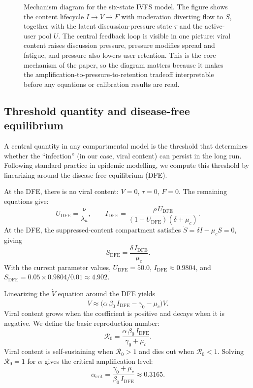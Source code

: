 \documentclass[11pt]{article}
\begin{document}
\begin{figure}[htbp]
\begin{tikzpicture}
\end{tikzpicture}
\caption{Mechanism diagram for the six-state IVFS model. The figure shows the content lifecycle $I \to V \to F$ with moderation diverting flow to $S$, together with the latent discussion-pressure state $\tau$ and the active-user pool $U$. The central feedback loop is visible in one picture: viral content raises discussion pressure, pressure modifies spread and fatigue, and pressure also lowers user retention. This is the core mechanism of the paper, so the diagram matters because it makes the amplification-to-pressure-to-retention tradeoff interpretable before any equations or calibration results are read.}
\label{fig:structure}
\end{figure}

\subsection{Threshold quantity and disease-free equilibrium}
\label{sec:threshold}

A central quantity in any compartmental model is the threshold that determines whether the ``infection'' (in our case, viral content) can persist in the long run. Following standard practice in epidemic modelling, we compute this threshold by linearizing around the disease-free equilibrium (DFE).

At the DFE, there is no viral content: $V = 0$, $\tau = 0$, $F = 0$. The remaining equations give:
\begin{equation}
U_{\mathrm{DFE}} = \frac{\nu}{\lambda_u}, \qquad
I_{\mathrm{DFE}} = \frac{\rho\, U_{\mathrm{DFE}}}{(1 + U_{\mathrm{DFE}})(\delta + \mu_c)}.
\label{eq:dfe}
\end{equation}
At the DFE, the suppressed-content compartment satisfies $\dot{S} = \delta I - \mu_c S = 0$, giving
\[
S_{\mathrm{DFE}} = \frac{\delta\, I_{\mathrm{DFE}}}{\mu_c}.
\]
With the current parameter values, $U_{\mathrm{DFE}} = 50.0$, $I_{\mathrm{DFE}} \approx 0.9804$, and $S_{\mathrm{DFE}} = 0.05 \times 0.9804 / 0.01 \approx 4.902$.

Linearizing the $\dot{V}$ equation around the DFE yields
\[
\dot{V} \approx \bigl(\alpha\,\beta_0\,I_{\mathrm{DFE}} - \gamma_0 - \mu_c\bigr) V.
\]
Viral content grows when the coefficient is positive and decays when it is negative. We define the basic reproduction number:
\begin{equation}
\boxed{\mathcal{R}_0 = \frac{\alpha\,\beta_0\,I_{\mathrm{DFE}}}{\gamma_0 + \mu_c}.}
\label{eq:R0}
\end{equation}
Viral content is self-sustaining when $\mathcal{R}_0 > 1$ and dies out when $\mathcal{R}_0 < 1$. Solving $\mathcal{R}_0 = 1$ for $\alpha$ gives the critical amplification level:
\begin{equation}
\alpha_{\mathrm{crit}} = \frac{\gamma_0 + \mu_c}{\beta_0\,I_{\mathrm{DFE}}} \approx 0.3165.
\label{eq:alpha_crit}
\end{equation}
\end{document}
